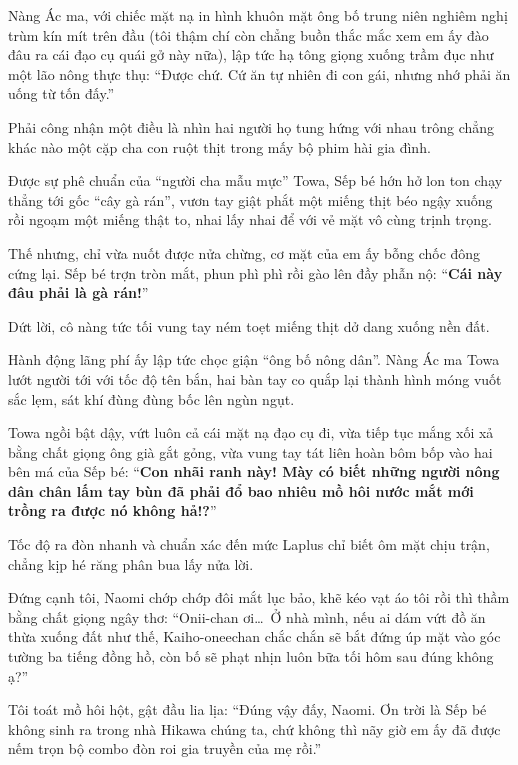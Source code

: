 \documentclass[../main.tex]{subfiles}
\begin{document}
Nàng Ác ma, với chiếc mặt nạ in hình khuôn mặt ông bố trung niên nghiêm nghị trùm kín mít trên đầu (tôi thậm chí còn chẳng buồn thắc mắc xem em ấy đào đâu ra cái đạo cụ quái gở này nữa), lập tức hạ tông giọng xuống trầm đục như một lão nông thực thụ: ``Được chứ. Cứ ăn tự nhiên đi con gái, nhưng nhớ phải ăn uống từ tốn đấy.''


Phải công nhận một điều là nhìn hai người họ tung hứng với nhau trông chẳng khác nào một cặp cha con ruột thịt trong mấy bộ phim hài gia đình.

Được sự phê chuẩn của ``người cha mẫu mực'' Towa, Sếp bé hớn hở lon ton chạy thẳng tới gốc ``cây gà rán'', vươn tay giật phắt một miếng thịt béo ngậy xuống rồi ngoạm một miếng thật to, nhai lấy nhai để với vẻ mặt vô cùng trịnh trọng.

Thế nhưng, chỉ vừa nuốt được nửa chừng, cơ mặt của em ấy bỗng chốc đông cứng lại. Sếp bé trợn tròn mắt, phun phì phì rồi gào lên đầy phẫn nộ: ``\textbf{Cái này đâu phải là gà rán!}''

Dứt lời, cô nàng tức tối vung tay ném toẹt miếng thịt dở dang xuống nền đất.

Hành động lãng phí ấy lập tức chọc giận ``ông bố nông dân''. Nàng Ác ma Towa lướt người tới với tốc độ tên bắn, hai bàn tay co quắp lại thành hình móng vuốt sắc lẹm, sát khí đùng đùng bốc lên ngùn ngụt.


Towa ngồi bật dậy, vứt luôn cả cái mặt nạ đạo cụ đi, vừa tiếp tục mắng xối xả bằng chất giọng ông già gắt gỏng, vừa vung tay tát liên hoàn bôm bốp vào hai bên má của Sếp bé: ``\textbf{Con nhãi ranh này! Mày có biết những người nông dân chân lấm tay bùn đã phải đổ bao nhiêu mồ hôi nước mắt mới trồng ra được nó không hả!?}''


Tốc độ ra đòn nhanh và chuẩn xác đến mức Laplus chỉ biết ôm mặt chịu trận, chẳng kịp hé răng phân bua lấy nửa lời.

Đứng cạnh tôi, Naomi chớp chớp đôi mắt lục bảo, khẽ kéo vạt áo tôi rồi thì thầm bằng chất giọng ngây thơ: ``Onii-chan ơi\dots\ Ở nhà mình, nếu ai dám vứt đồ ăn thừa xuống đất như thế, Kaiho-oneechan chắc chắn sẽ bắt đứng úp mặt vào góc tường ba tiếng đồng hồ, còn bố sẽ phạt nhịn luôn bữa tối hôm sau đúng không ạ?''

Tôi toát mồ hôi hột, gật đầu lia lịa: ``Đúng vậy đấy, Naomi. Ơn trời là Sếp bé không sinh ra trong nhà Hikawa chúng ta, chứ không thì nãy giờ em ấy đã được nếm trọn bộ combo đòn roi gia truyền của mẹ rồi.''
\end{document}
